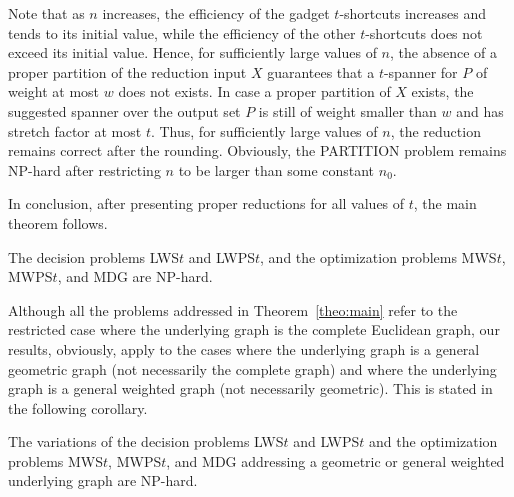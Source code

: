 \documentclass[a4paper]{llncs}
\begin{document}
Note that as $n$ increases, the efficiency of the gadget $t$-shortcuts
increases and tends to its initial value,
while the efficiency of the other $t$-shortcuts does not exceed its initial value.
Hence, for sufficiently large values of $n$, the absence of 
a proper partition of the reduction input $X$ guarantees that a $t$-spanner for $P$
of weight at most $w$ does not exists.
In case a proper partition of $X$ exists,
the suggested spanner over the output set $P$ is still of weight smaller than $w$
and has stretch factor at most $t$. 
Thus, for sufficiently large values of $n$, 
the reduction remains correct after the rounding.
Obviously, the PARTITION problem remains NP-hard after restricting $n$ to be larger
than some constant $n_0$. 

In conclusion, after presenting proper reductions for all values of $t$, the main theorem follows.

\begin{theorem}\label{theo:main}
The decision problems LWS$t$ and LWPS$t$, and the optimization problems MWS$t$, MWPS$t$, and MDG are NP-hard.
\end{theorem}

Although all the problems addressed in Theorem~\ref{theo:main} refer to the restricted case 
where the underlying graph is the complete Euclidean graph, 
our results, obviously, apply to the cases where the underlying graph is
a general geometric graph (not necessarily the complete graph) and 
where the underlying graph is a general weighted graph (not necessarily geometric).
This is stated in the following corollary.


\begin{corollary}
The variations of the decision problems LWS$t$ and LWPS$t$ and the optimization problems MWS$t$, MWPS$t$, and MDG 
addressing a geometric or general weighted underlying graph are NP-hard.
\end{corollary}





\end{document}
